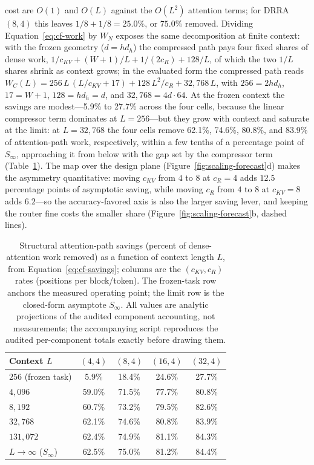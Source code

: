 cost are
$O(1)$ and $O(L)$ against the $O(L^2)$ attention terms; for DRRA
$(8,4)$ this leaves $1/8 + 1/8 = 25.0\%$, or $75.0\%$ removed.
Dividing
Equation~\ref{eq:cf-work} by $W_N$ exposes the same decomposition at
finite context: with the frozen geometry ($d = h d_h$) the compressed
path pays four fixed shares of dense work,
$1/c_{KV} + (W+1)/L + 1/(2 c_R) + 128/L$, of which the two
$1/L$ shares shrink as context grows; in the evaluated form the
compressed path reads $W_C(L) = 256\,L\,(L/c_{KV} + 17) + 128\,L^2/c_R +
32{,}768\,L$, with $256 = 2 h d_h$, $17 = W + 1$, $128 = h d_h = d$, and
$32{,}768 = 4d\cdot 64$. At the frozen context the
savings are modest---5.9\% to 27.7\% across the four cells, because the
linear compressor term dominates at $L{=}256$---but they grow with
context and saturate at the limit: at $L{=}32{,}768$ the four cells
remove 62.1\%, 74.6\%, 80.8\%, and 83.9\% of attention-path work,
respectively, within a few tenths of a percentage point of $S_\infty$,
approaching it from below with the gap set by the compressor term
(Table~\ref{tab:forecast}). The map over the design plane
(Figure~\ref{fig:scaling-forecast}d) makes the asymmetry quantitative:
moving $c_{KV}$ from $4$ to $8$ at $c_R{=}4$ adds $12.5$ percentage
points of asymptotic saving, while moving $c_R$ from $4$ to $8$ at
$c_{KV}{=}8$ adds $6.2$---so the accuracy-favored axis is also the larger
saving lever, and keeping the router fine costs the smaller share
(Figure~\ref{fig:scaling-forecast}b, dashed lines).

\begin{table}[t]
\centering
\small
\caption{Structural attention-path savings (percent of dense-attention
work removed) as a function of context length $L$, from
Equation~\ref{eq:cf-savings}; columns are the $(c_{KV}, c_R)$ rates (positions
per block/token). The frozen-task row anchors the measured
operating point; the limit row is the closed-form asymptote $S_\infty$.
All values are analytic projections of the audited component accounting,
not measurements; the accompanying script reproduces the audited
per-component totals exactly before drawing them.}
\label{tab:forecast}
\begin{tabular}{lcccc}
\toprule
Context $L$ & $(4,4)$ & $(8,4)$ & $(16,4)$ & $(32,4)$ \\
\midrule
$256$ (frozen task) & 5.9\% & 18.4\% & 24.6\% & 27.7\% \\
$4{,}096$   & 59.0\% & 71.5\% & 77.7\% & 80.8\% \\
$8{,}192$   & 60.7\% & 73.2\% & 79.5\% & 82.6\% \\
$32{,}768$  & 62.1\% & 74.6\% & 80.8\% & 83.9\% \\
$131{,}072$ & 62.4\% & 74.9\% & 81.1\% & 84.3\% \\
$L \to \infty$ ($S_\infty$) & 62.5\% & 75.0\% & 81.2\% & 84.4\% \\
\bottomrule
\end{tabular}
\end{table}

